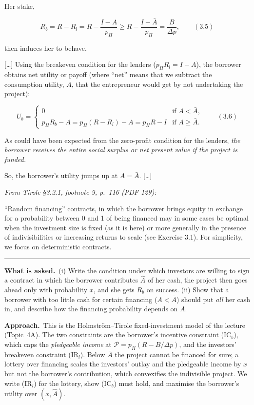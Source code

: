 \documentclass[11pt,a4paper]{article}
\newcommand{\asked}{\par\medskip\noindent\textbf{What is asked.}~}
\newcommand{\approach}{\par\smallskip\noindent\textbf{Approach.}~}
\newcommand{\stmtend}{\par\endgroup\nopagebreak\noindent\rule{\linewidth}{0.4pt}\par\medskip}
\begin{document}
Her stake,

\[R_b = R - R_l = R - \frac{I - A}{p_H} \geqslant R - \frac{I - \bar A}{p_H} = \frac{B}{\Delta p}, \qquad (3.5)\]

then induces her to behave.

{[}\ldots{]} Using the breakeven condition for the lenders (\(p_H R_l = I - A\)), the borrower
obtains net utility or payoff (where ``net'' means that we subtract the consumption utility, \(A\),
that the entrepreneur would get by not undertaking the project):

\[U_b = \begin{cases} 0 & \text{if } A < \bar A, \\ p_H R_b - A = p_H(R - R_l) - A = p_H R - I & \text{if } A \geqslant \bar A. \end{cases} \qquad (3.6)\]

As could have been expected from the zero-profit condition for the lenders, \emph{the borrower
receives the entire social surplus or net present value if the project is funded.}

So, the borrower's utility jumps up at \(A = \bar A\). {[}\ldots{]}

\emph{From Tirole §3.2.1, footnote 9, p.~116 (PDF 129):}

``Random financing'' contracts, in which the borrower brings equity in exchange for a probability
between 0 and 1 of being financed may in some cases be optimal when the investment size is fixed (as
it is here) or more generally in the presence of indivisibilities or increasing returns to scale
(see Exercise 3.1). For simplicity, we focus on deterministic contracts.
\stmtend

\asked (i) Write the condition under which investors are willing to sign a contract in which the
borrower contributes $\hat A$ of her cash, the project then goes ahead only with probability $x$,
and she gets $R_b$ on success. (ii) Show that a borrower with too little cash for certain financing
($A<\bar A$) should put \emph{all} her cash in, and describe how the financing probability depends
on $A$.

\approach This is the Holmstr\"om--Tirole fixed-investment model of the lecture (Topic~4A). The two
constraints are the borrower's incentive constraint (IC$_b$), which caps the \emph{pledgeable income}
at $\mathcal P=p_H(R-B/\Delta p)$, and the investors' breakeven constraint (IR$_l$). Below $\bar A$
the project cannot be financed for sure; a lottery over financing scales the investors' outlay and
the pledgeable income by $x$ but not the borrower's contribution, which convexifies the
indivisible project. We write (IR$_l$) for the lottery, show (IC$_b$) must hold, and maximise the
borrower's utility over $(x,\hat A)$.
\end{document}
